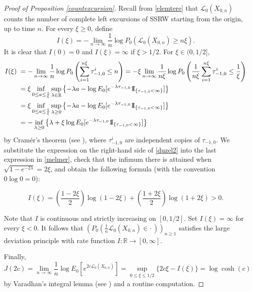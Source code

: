\documentclass[a4paper]{amsart}
\numberwithin{equation}{section}
\theoremstyle{plain}
\theoremstyle{remark}
\begin{document}
\begin{proof}[Proof of Proposition \ref{countexcursion}]
	Recall from \eqref{elemtere} that $\mathcal{L}_0(X_{0,n})$ counts the number of complete left excursions of SSRW starting from the origin,
	{}{up to time $n$}. For every $\xi\ge0$, define
	$$I(\xi) = - \lim_{n\to\infty}\frac1{n}\log P_0(\mathcal{L}_0(X_{0,n}) \ge n \xi).$$
	It is clear that $I(0) = 0$ and $I(\xi) = \infty$ if $\xi>1/2$. For $\xi\in(0,1/2]$,
	\begin{equation}
	\begin{aligned}\label{melmer}
	I(\xi) 
	&\;= - \lim_{n\to\infty}\frac1{n}\log P_0\left(\sum_{i=1}^{n\xi} \tau_{-1,0}^i \le n\right) = - \xi\lim_{n\to\infty}\frac1{n\xi}\log P_0\left(\frac1{n\xi}\sum_{i=1}^{n\xi} \tau_{-1,0}^i \le \frac1{\xi}\right)\\
	&\;= \xi\inf_{0\le a\le \frac1{\xi}}\sup_{\lambda\in\mathbb{R}}\left\{-\lambda a  - \log E_0[e^{-\lambda\tau_{-1,0}}{{{\rm 1\mkern-1.5mu}\!{\rm I}}}_{\{\tau_{-1,0}<\infty\}}]\right\}\\
	&\;= \xi\inf_{0\le a\le \frac1{\xi}}\sup_{\lambda\ge 0}\left\{-\lambda a  - \log E_0[e^{-\lambda\tau_{-1,0}}{{{\rm 1\mkern-1.5mu}\!{\rm I}}}_{\{\tau_{-1,0}<\infty\}}]\right\}\\
	&\;= -\inf_{\lambda \ge 0}\left\{\lambda + \xi \log E_0[e^{-\lambda\tau_{-1,0}}{{{\rm 1\mkern-1.5mu}\!{\rm I}}}_{\{\tau_{-1,0}<\infty\}}]\right\}
	\end{aligned}
	\end{equation}
	by Cram\'er's theorem (see \cite[Theorem 2.2.3]{DemZei2010}), where $\tau_{-1,0}^i$ are independent copies of $\tau_{-1,0}$. We substitute the expression on the right-hand side of \eqref{duzel2} into the last expression in \eqref{melmer}, check that the infimum there is attained when $\sqrt{1 - e^{-2\lambda}} = 2\xi$, and obtain the following formula (with the convention $0\log0 = 0$):
	
	$$I(\xi) = \left(\frac{1-2\xi}{2}\right)\log(1 - 2\xi) + \left(\frac{1+2\xi}{2}\right)\log(1 + 2\xi) > 0.$$
	
	Note that $I$ is continuous and strictly increasing on $[0,1/2]$. Set $I(\xi) = \infty$ for every $\xi<0$. It follows that $\left(P_0(\frac1{n}\mathcal{L}_0(X_{0,n}) \in \cdot\,)\right)_{n\ge1}$ satisfies the large deviation principle with rate function $I:\mathbb{R}\to[0,\infty]$. 
	
	Finally,
	$$J(2c) = \lim_{n\to\infty}\frac1{n}\log E_0\left[e^{2c\mathcal{L}_0(X_{0,n})}\right] = \sup_{0\le\xi\le1/2}\{2c\xi - I(\xi)\} = \log\cosh(c)$$
	by Varadhan's integral lemma (see \cite[Theorem 4.3.1]{DemZei2010}) and a routine computation.
	

\end{proof}
\end{document}
